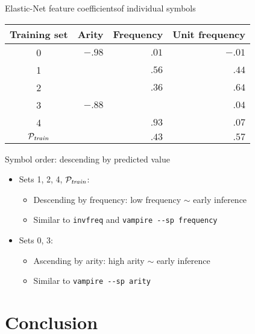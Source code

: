 \documentclass[notes]{beamer}
\begin{document}
\begin{frame}{Elastic-Net feature coefficients}{of individual symbols}

\begin{table}
\begin{tabular}{c|rrr}
	Training set & Arity & Frequency & Unit frequency \\
	\hline
	0 & $-.98$ & $ .01$ & $-.01$ \\
	1 &        & $ .56$ & $ .44$ \\
	2 &        & $ .36$ & $ .64$ \\
	3 & $-.88$ &        & $ .04$ \\
	4 &        & $ .93$ & $ .07$ \\
	\hline
	\(\mathcal{P}_{\mathit{train}}\) &        & $ .43$ & $ .57$ \\
\end{tabular}
\end{table}

Symbol order: descending by predicted value

\begin{itemize}
	\item Sets 1, 2, 4, $\mathcal{P}_{\mathit{train}}$:
	\begin{itemize}
		\item Descending by frequency: low frequency $\sim$ early inference
		\item Similar to \texttt{invfreq} and \texttt{vampire \--\--sp frequency}
	\end{itemize}
	\item Sets 0, 3:
	\begin{itemize}
		\item Ascending by arity: high arity $\sim$ early inference
		\item Similar to \texttt{vampire \--\--sp arity}
	\end{itemize}
\end{itemize}

\end{frame}

\section{Conclusion}
\end{document}
